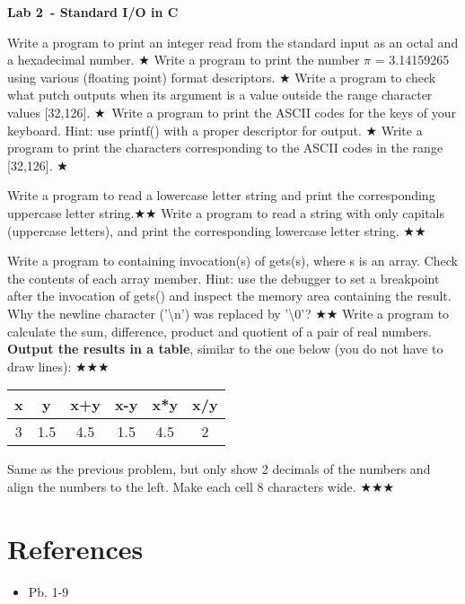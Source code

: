 \documentclass{exam}
\newcommand\labnr{2}
\newcommand\lab{Lab \labnr\ - Standard I/O in C}
\newcommand\lvlez{$\bigstar$}
\newcommand\lvlmed{\lvlez\lvlez}
\newcommand\lvlhard{\lvlmed\lvlez}
\begin{document}
\begin{center}
    \vspace*{0cm}
    \bfseries\LARGE
    \lab
    \vspace*{1cm}
\end{center}


\begin{questions}   
   \question Write a program to print an integer read from the standard input as an octal and a hexadecimal
number.  \lvlez 
   \question Write a program to print the number $\pi$ = 3.14159265 using various (floating point) format
descriptors.  \lvlez 
    \question Write a program to check what putch outputs when its argument is a value outside the range
character values [32,126].  \lvlez \
   \question Write a program to print the ASCII codes for the keys of your keyboard. Hint: use printf() with a
proper descriptor for output. \lvlez  
   \question Write a program to print the characters corresponding to the ASCII codes in the range [32,126].   \lvlez 

   \question Write a program to read a lowercase letter string and print the corresponding uppercase letter string.\lvlmed 
   \question Write a program to read a string with only capitals (uppercase letters), and print the corresponding
lowercase letter string. \lvlmed 

\question Write a program to containing invocation(s) of gets(s), where s is an array. Check the contents of
each array member. Hint: use the debugger to set a breakpoint after the invocation of gets() and
inspect the memory area containing the result. Why the newline character ('\textbackslash n') was replaced by '\textbackslash 0'?  \lvlmed
   \question Write a program to calculate the sum, difference, product and quotient of a pair of real numbers.
\textbf{Output the results in a table}, similar to the one below (you do not have to draw lines):   \lvlhard 
\begin{center}
   
\begin{tabular}{|c|c|c|c|c|c|}
   \hline
   x & y & x+y & x-y & x*y & x/y \\
   \hline
   3 & 1.5 & 4.5 & 1.5 & 4.5 & 2 \\
   \hline
\end{tabular}
\end{center}

\question Same as the previous problem, but only show 2 decimals of the numbers and align the numbers to the left. Make each cell 8 characters wide. \lvlhard
\end{questions}

\medskip
\section*{References}
\begin{itemize}
   \item Pb. 1-9 \cite{cplab02}
\end{itemize}
\printbibliography[heading=none]
\end{document}
